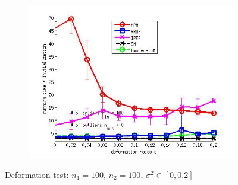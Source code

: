 \documentclass[
	fontsize=12pt,
	paper=a4,
	twoside=false,
	numbers=noenddot,
	plainheadsepline,
	toc=listof,
	toc=bibliography
]{scrartcl}
\begin{document}
\begin{figure}[h]
\begin{subfigure}[b]{0.3\textwidth}
		\includegraphics[scale=0.25]{"fig_ver2608/syntheticPointSets/ver4.3.2/deformation/time_summary_avg10t"} 
	\end{subfigure} 	
	\caption{Deformation test: $n_1=100$, $n_2=100$, $\sigma^2\in[0, 0.2]$}
	\label{fig:test1_ver432}
\end{figure}

\FloatBarrier	
\end{document}
